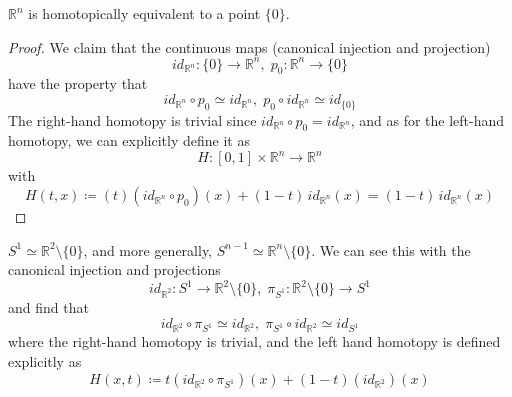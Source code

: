 	\begin{theorem}[$\mathbb{R}^n$]
	  \label{thm:rn}
    $\mathbb{R}^n$ is homotopically equivalent to a point $\{0\}$.
  \end{theorem}
  \begin{proof}
    We claim that the continuous maps (canonical injection and projection)
    \begin{equation}
      id_{\mathbb{R}^n}: \{0\} \to \mathbb{R}^n , \; p_0 : \mathbb{R}^n \to \{0\}
    \end{equation}
    have the property that 
    \begin{equation}
      id_{\mathbb{R}^n} \circ p_0 \simeq id_{\mathbb{R}^n} , \; p_0 \circ id_{\mathbb{R}^n} \simeq id_{\{0\}}
    \end{equation}
    The right-hand homotopy is trivial since $id_{\mathbb{R}^n} \circ p_0 = id_{\mathbb{R}^n}$, and as for the left-hand homotopy, we can explicitly define it as
    \begin{equation}
      H: [0,1] \times \mathbb{R}^n \to \mathbb{R}^n
    \end{equation}
    with
    \begin{equation}
      H(t, x) \coloneqq (t) (id_{\mathbb{R}^n} \circ p_0 )(x) + (1-t) \, id_{\mathbb{R}^n} (x) = (1-t)\, id_{\mathbb{R}^n} (x)
    \end{equation}
  \end{proof}

	\begin{example}
	  \label{ex:sn1simeqrnsetminus0}
    $S^1 \simeq \mathbb{R}^2 \setminus \{0\}$, and more generally, $S^{n-1} \simeq \mathbb{R}^n \setminus \{0\}$. We can see this with the canonical injection and projections
    \begin{equation}
      id_{\mathbb{R}^2}: S^1 \to \mathbb{R}^2 \setminus \{0\}, \; \pi_{S^1}: \mathbb{R}^2 \setminus \{0\} \to S^1
    \end{equation}
    and find that
    \begin{equation}
      id_{\mathbb{R}^2} \circ \pi_{S^1} \simeq id_{\mathbb{R}^2}, \; \pi_{S^1} \circ id_{\mathbb{R}^2} \simeq id_{S^1}
    \end{equation}
    where the right-hand homotopy is trivial, and the left hand homotopy is defined explicitly as
    \begin{equation}
      H(x, t) \coloneqq t (id_{\mathbb{R}^2} \circ \pi_{S^1})(x) + (1-t) (id_{\mathbb{R}^2})(x)
    \end{equation}
  \end{example}

